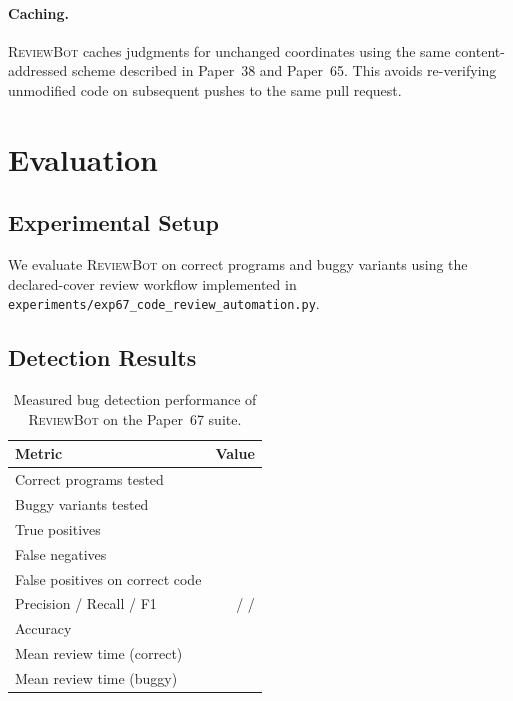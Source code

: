 \documentclass[11pt]{article}
\newcommand{\ReviewBot}{\textsc{ReviewBot}}
\begin{document}
\paragraph{Caching.}
\ReviewBot{} caches judgments for unchanged coordinates using the same
content-addressed scheme described in Paper~38 and Paper~65. This avoids
re-verifying unmodified code on subsequent pushes to the same pull request.

\section{Evaluation}\label{sec:evaluation}

\subsection{Experimental Setup}

We evaluate \ReviewBot{} on \ppLXVIIcorrectCount{} correct programs and
\ppLXVIIbuggyCount{} buggy variants using the declared-cover review workflow
implemented in \texttt{experiments/exp67\_code\_review\_automation.py}.

\subsection{Detection Results}

\begin{table}[t]
\centering
\caption{Measured bug detection performance of \ReviewBot{} on the Paper~67 suite.}
\label{tab:bug-detection}
\begin{tabular}{lr}
\toprule
\textbf{Metric} & \textbf{Value} \\
\midrule
Correct programs tested & \ppLXVIIcorrectCount{} \\
Buggy variants tested & \ppLXVIIbuggyCount{} \\
True positives & \ppLXVIItruePositive{} \\
False negatives & \ppLXVIIfalseNegative{} \\
False positives on correct code & \ppLXVIIfalsePositive{} \\
Precision / Recall / F1 & \ppLXVIIprecision{} / \ppLXVIIrecall{} / \ppLXVIIfOne{} \\
Accuracy & \ppLXVIIaccuracyPct{} \\
Mean review time (correct) & \ppLXVIIcorrectTimeMean{} \\
Mean review time (buggy) & \ppLXVIIbuggyTimeMean{} \\
\bottomrule
\end{tabular}
\end{table}
\end{document}
